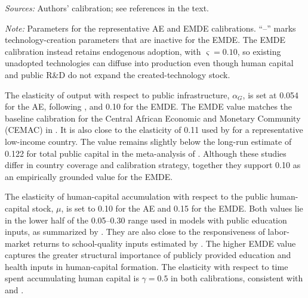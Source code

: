 \documentclass[a4paper,11pt]{article}
\newcommand{\tabnote}[2]{\vspace{2mm}\par\noindent\begin{minipage}{0.9\textwidth}\footnotesize\setlength{\parindent}{0pt}\emph{Sources: }#1\par\vspace{2mm}\emph{Note: }#2\end{minipage}}
\begin{document}
\begin{table}[H]
    \centering
    \caption{Structural Parameters for Productive-Spending Channels \label{tab:parameters}}
    \footnotesize
    \renewcommand{\arraystretch}{1.2}
    

\vspace{1mm}
\tabnote{Authors' calibration; see references in the text.}{Parameters for the representative AE and EMDE calibrations.
``--'' marks technology-creation parameters that are inactive for the EMDE.
The EMDE calibration instead retains endogenous adoption, with $\varsigma=0.10$, so existing unadopted technologies can diffuse into production even though human capital and public R\&D do not expand the created-technology stock.}
\end{table}

The elasticity of output with respect to public infrastructure, $\alpha_G$, is set at 0.054 for the AE, following \citet{TraumYang2015}, and 0.10 for the EMDE.
The EMDE value matches the baseline calibration for the Central African Economic and Monetary Community (CEMAC) in \citet{BergPortilloYangZanna2012}.
It is also close to the elasticity of 0.11 used by \citet{Atoliaetal2021} for a representative low-income country.
The value remains slightly below the long-run estimate of 0.122 for total public capital in the meta-analysis of \citet{BomLigthart2014}.
Although these studies differ in country coverage and calibration strategy, together they support 0.10 as an empirically grounded value for the EMDE.

The elasticity of human-capital accumulation with respect to the public human-capital stock, $\mu$, is set to 0.10 for the AE and 0.15 for the EMDE.
Both values lie in the lower half of the 0.05--0.30 range used in models with public education inputs, as summarized by \citet{Djajicetal2018}.
They are also close to the responsiveness of labor-market returns to school-quality inputs estimated by \citet{CardKrueger1992}.
The higher EMDE value captures the greater structural importance of publicly provided education and health inputs in human-capital formation.
The elasticity with respect to time spent accumulating human capital is $\gamma=0.5$ in both calibrations, consistent with \citet{Atoliaetal2021} and \citet{Dissouetal2016}.
\end{document}
